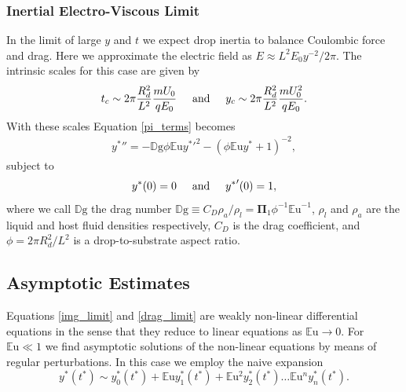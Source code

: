\documentclass[aip,reprint, floatfix]{revtex4-1}
\begin{document}
\subsubsection{Inertial Electro-Viscous Limit}
In the limit of large $y$ and $t$ we expect drop inertia to balance Coulombic force and drag. Here we approximate the electric field as $E \approx L^2 E_0 y^{-2}/2\pi$. The intrinsic scales for this case are given by
\[ t_c \sim 2 \pi \frac{R_d^2}{L^2} \frac{ m U_0}{q E_0} \hspace{5mm} \mbox{and} \hspace{5 mm} y_c \sim 2 \pi \frac{R_d^2}{L^2} \frac{ m U_0^2}{q E_0}.
\]
With these scales Equation \ref{pi_terms} becomes 
\begin{eqnarray}
&{y^*}'' = - \mathbb{D}\mbox{g} \phi \mathbb{E}\mbox{u} {y^*}'^2 - \left( \phi \mathbb{E}\mbox{u} {y^*} + 1 \right)^{-2}, & \label{drag_limit}
\end{eqnarray}
subject to 
\begin{equation*}
{y^*}(0) = 0 \hspace{5 mm} \mbox{and} \hspace{5 mm} {y^*}'(0) = 1, 
\end{equation*}
where we call $\mathbb{D}\mbox{g}$ the drag number $\mathbb{D}\mbox{g} \equiv C_D \rho_a / \rho_l = \mathbf{\Pi}_1 \phi^{-1}{\mathbb{E}\mbox{u}}^{-1}$, $\rho_l$ and $\rho_a$ are the liquid and host fluid densities respectively, $C_D$ is the drag coefficient, and $\phi = 2 \pi R_d^2 / L^2$ is a drop-to-substrate aspect ratio.

\subsection{Asymptotic Estimates}
Equations \ref{img_limit} and \ref{drag_limit} are weakly non-linear differential equations in the sense that they reduce to linear equations as $\mathbb{E}\mbox{u} \rightarrow 0$. For $\mathbb{E}\mbox{u} \ll 1$ we find asymptotic solutions of the non-linear equations by means of regular perturbations. In this case we employ the naive expansion
\begin{equation}
{y^*}({t^*}) \sim y^*_0({t^*}) + \mathbb{E}\mbox{u} y^*_1({t^*}) + \mathbb{E}\mbox{u}^2 y^*_2({t^*}) \ldots \mathbb{E}\mbox{u}^n y^*_n ({t^*})  . \label{regular_pert}
\end{equation}
\end{document}

